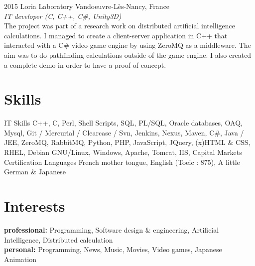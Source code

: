\documentclass[]{friggeri-cv} %
\begin{document}
\begin{entrylist}

\entry
{2015}
{Loria Laboratory}
{Vandoeuvre-Lès-Nancy, France\\}
{ \emph {IT developer (C, C++, C\#, Unity3D)}\\
The project was part of a research work on distributed artificial intelligence calculations. I managed to create a client-server application in C++ that interacted with a C\# video game engine by using ZeroMQ as a middleware. The aim was to do pathfinding calculations outside of the game engine. I also created a complete demo in order to have a proof of concept. }


\end{entrylist}


\section{Skills}
\begin{entrylist}
\entry
{ }
{IT Skills}
{ }
{ C++, C, Perl, Shell Scripts, SQL, PL/SQL, Oracle databases, OAQ, Mysql, Git / Mercurial / Clearcase / Svn, Jenkins, Nexus, Maven, C\#, Java / JEE,  ZeroMQ, RabbitMQ, Python, PHP, JavaScript, JQuery, (x)HTML \& CSS, RHEL, Debian GNU/Linux, Windows, Apache, Tomcat, IIS, Capital Markets Certification }
\entry
{ }
{Languages}
{ }
{French mother tongue, English (Toeic : 875), A little German \& Japanese}
\end{entrylist}
\section{Interests}

\textbf{professional:} Programming, Software design \& engineering, Artificial Intelligence, Distributed calculation \\
\textbf{personal:} Programming, News, Music, Movies, Video games, Japanese Animation


\end{document}
